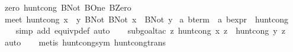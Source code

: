 \begin{isabellebody}
{}\ zero{}\ {}hunt{}cong\ {}BNot\ BOne{}\ BZero{}\isanewline
{}\ meet{}\ {}hunt{}cong\ {}x\ {}{}{}\ y{}\ {}BNot\ {}BNot\ x\ {}{}{}\ BNot\ y{}{}{}\isanewline
\isanewline
{}\isamarkupfalse%
\ {}a\ bterm\ {}\ {}{}a\ bexpr{}\ {}\ {}hunt{}cong{}\isanewline
%
\isadelimproof
\ \ %
\endisadelimproof
%
\isatagproof
{}\isamarkupfalse%
\ {}simp\ add{}\ equivp{}def{}\ auto{}\isanewline
\ \ \isamarkupfalse%
\ {}subgoal{}tac\ {}{}z{}\ hunt{}cong\ x\ z\ {}\ hunt{}cong\ y\ z{}{}\isanewline
\ \ \isamarkupfalse%
\ auto\isanewline
\ \ \isamarkupfalse%
\ {}metis\ hunt{}cong{}sym\ hunt{}cong{}trans{}{}%
\endisatagproof

\end{isabellebody}
